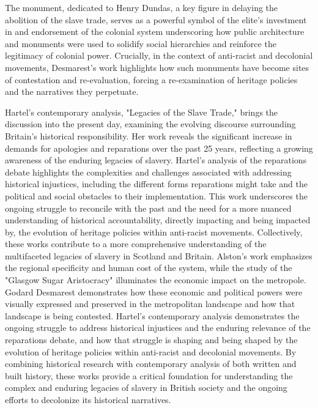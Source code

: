 \documentclass{scrartcl}
\begin{document}
The monument, dedicated to Henry Dundas, a key figure in delaying the abolition of the slave trade, serves as a powerful symbol of the elite's investment in and endorsement of the colonial system underscoring how public architecture and monuments were used to solidify social hierarchies and reinforce the legitimacy of colonial power.
Crucially, in the context of anti-racist and decolonial movements, Desmarest’s work highlights how such monuments have become sites of contestation and re-evaluation, forcing a re-examination of heritage policies and the narratives they perpetuate.

Hartel's contemporary analysis, "Legacies of the Slave Trade," brings the discussion into the present day, examining the evolving discourse surrounding Britain's historical responsibility.
Her work reveals the significant increase in demands for apologies and reparations over the past 25 years, reflecting a growing awareness of the enduring legacies of slavery.
Hartel's analysis of the reparations debate highlights the complexities and challenges associated with addressing historical injustices, including the different forms reparations might take and the political and social obstacles to their implementation.
This work underscores the ongoing struggle to reconcile with the past and the need for a more nuanced understanding of historical accountability, directly impacting and being impacted by, the evolution of heritage policies within anti-racist movements.
Collectively, these works contribute to a more comprehensive understanding of the multifaceted legacies of slavery in Scotland and Britain.
Alston's work emphasizes the regional specificity and human cost of the system, while the study of the "Glasgow Sugar Aristocracy" illuminates the economic impact on the metropole.
Godard Desmarest demonstrates how these economic and political powers were visually expressed and preserved in the metropolitan landscape and how that landscape is being contested.
Hartel's contemporary analysis demonstrates the ongoing struggle to address historical injustices and the enduring relevance of the reparations debate, and how that struggle is shaping and being shaped by the evolution of heritage policies within anti-racist and decolonial movements.
By combining historical research with contemporary analysis of both written and built history, these works provide a critical foundation for understanding the complex and enduring legacies of slavery in British society and the ongoing efforts to decolonize its historical narratives.
\end{document}
